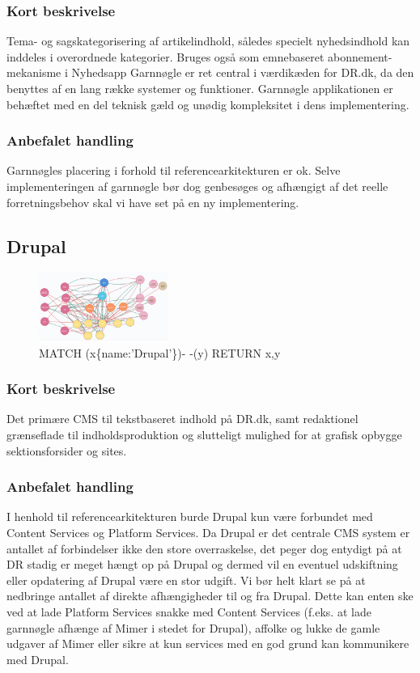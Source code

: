 \documentclass{article}
\begin{document}
\subsubsection*{Kort beskrivelse}
Tema- og sagskategorisering af artikelindhold, således specielt nyhedsindhold kan inddeles i overordnede kategorier. Bruges også som emnebaseret abonnement-mekanisme i Nyhedsapp
Garnnøgle er ret central i værdikæden for DR.dk, da den benyttes af en lang række systemer og funktioner. Garnnøgle applikationen er behæftet med en del teknisk gæld og unødig kompleksitet i dens implementering.
\subsubsection*{Anbefalet handling}
Garnnøgles placering i forhold til referencearkitekturen er ok. Selve implementeringen af garnnøgle bør dog genbesøges og afhængigt af det reelle forretningsbehov skal vi have set på en ny implementering.


\subsection{Drupal}
\begin{figure}[h]
\includegraphics[width=120pt]{Drupal.PNG}
\caption{MATCH (x\{name:'Drupal'\})- -(y) RETURN x,y}
\end{figure}
\subsubsection*{Kort beskrivelse}
Det primære CMS til tekstbaseret indhold på DR.dk, samt redaktionel grænseflade til indholdsproduktion og slutteligt mulighed for at grafisk opbygge sektionsforsider og sites.
\subsubsection*{Anbefalet handling}
I henhold til referencearkitekturen burde Drupal kun være forbundet med Content Services og Platform Services. Da Drupal er det centrale CMS system er antallet af forbindelser ikke den store overraskelse, det peger dog entydigt på at DR stadig er meget hængt op på Drupal og dermed vil en eventuel udskiftning eller opdatering af Drupal være en stor udgift.
Vi bør helt klart se på at nedbringe antallet af direkte afhængigheder til og fra Drupal. 
Dette kan enten ske ved at lade Platform Services snakke med Content Services (f.eks. at lade garnnøgle afhænge af Mimer i stedet for Drupal), affolke og lukke de gamle udgaver af Mimer eller sikre at kun services med en god grund kan kommunikere med Drupal.
\end{document}
